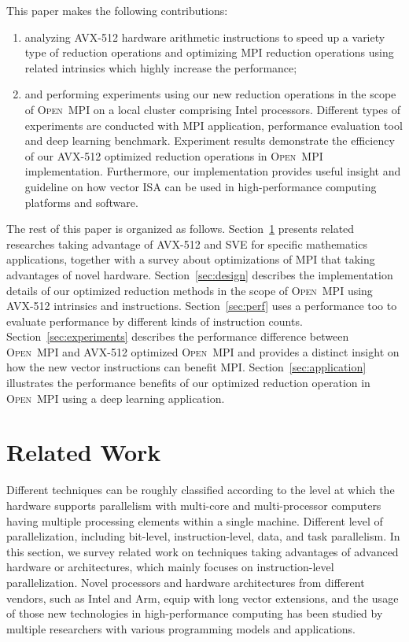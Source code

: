 \documentclass[sigconf]{acmart}
\newcommand{\ompi}[0]{\textsc{Open~MPI}\xspace}
\newcommand{\mpi}[0]{\textsc{MPI}\xspace}
\newcommand{\sve}[0]{\textsc{SVE}\xspace}
\begin{document}
This paper makes the following contributions:
\begin{enumerate}
  \item analyzing AVX-512 hardware arithmetic instructions to speed up a variety
  type of reduction operations and optimizing \mpi reduction operations using
  related intrinsics which highly increase the performance;
  \item and performing experiments using our new reduction operations in the scope
  of \ompi on a local cluster comprising Intel processors. Different types of
  experiments are conducted with \mpi application, performance evaluation tool and
  deep learning benchmark.
  Experiment results demonstrate the efficiency of our AVX-512 optimized reduction
  operations in \ompi implementation.
  Furthermore, our implementation provides useful insight and guideline on how vector
  ISA can be used in high-performance computing platforms and software.
\end{enumerate}

The rest of this paper is organized as follows.
Section~\ref{sec:related} presents related researches taking advantage of AVX-512 and \sve for specific mathematics applications, together with a survey about optimizations of \mpi that taking advantages of novel hardware.
Section~\ref{sec:design} describes the implementation details of our optimized reduction methods in the scope of \ompi using AVX-512 intrinsics and instructions.
Section~\ref{sec:perf} uses a performance too to evaluate performance by different kinds of instruction counts.
Section~\ref{sec:experiments} describes the performance difference between
\ompi and AVX-512 optimized \ompi and provides a distinct insight on how the
new vector instructions can benefit \mpi.
Section~\ref{sec:application} illustrates the performance benefits of our
optimized reduction operation in \ompi using a deep learning application.

\section{Related Work}\label{sec:related}
Different techniques can be roughly classified according to the level at which
the hardware supports parallelism with multi-core and multi-processor computers having
multiple processing elements within a single machine. Different level of parallelization,
including bit-level, instruction-level, data, and task parallelism.
%
In this section, we survey related work on techniques taking advantages of
advanced hardware or architectures, which mainly focuses on instruction-level parallelization.
Novel processors and hardware architectures from different vendors, such as Intel and Arm,
equip with long vector extensions, and the usage of those new technologies in high-performance computing has been
studied by multiple researchers with various programming models and applications.
%
\end{document}
